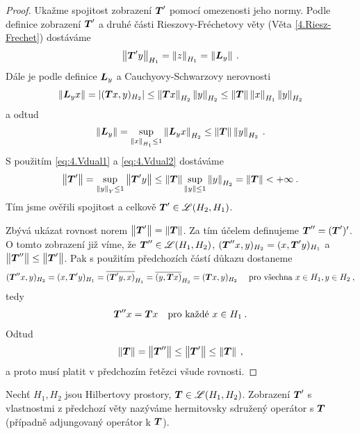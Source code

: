 \begin{proof}
Ukažme spojitost zobrazení $\boldsymbol{T}'$ pomocí omezenosti jeho normy. Podle definice zobrazení $\boldsymbol{T}'$ a druhé části Rieszovy-Fréchetovy věty (Věta \ref{4.Riesz-Frechet}) dostáváme \begin{align} \label{eq:4.Vdual1}
    \left\lVert\boldsymbol{T}' y\right\rVert_{H_1} = \left\lVert z\right\rVert_{H_1} = \left\lVert\boldsymbol{L}_y\right\rVert \:.
\end{align}
Dále je podle definice $\boldsymbol{L}_y$ a Cauchyovy-Schwarzovy nerovnosti \begin{align*}
    \left\lVert\boldsymbol{L}_y x\right\rVert = |(\boldsymbol{T}x, y)_{H_2}| \leq \left\lVert\boldsymbol{T}x\right\rVert_{H_2} \left\lVert y\right\rVert_{H_2} \leq \left\lVert\boldsymbol{T}\right\rVert \left\lVert x\right\rVert_{H_1} \left\lVert y\right\rVert_{H_2}
\end{align*}
a odtud \begin{align} \label{eq:4.Vdual2}
    \left\lVert\boldsymbol{L}_y\right\rVert = \sup_{\left\lVert x\right\rVert_{H_1} \leq 1} \left\lVert\boldsymbol{L}_y x\right\rVert_{H_2} \leq \left\lVert\boldsymbol{T}\right\rVert \left\lVert y\right\rVert_{H_2} \:.
\end{align}
S použitím \eqref{eq:4.Vdual1} a \eqref{eq:4.Vdual2} dostáváme \begin{align*}
    \left\lVert\boldsymbol{T}'\right\rVert = \sup_{\left\lVert y\right\rVert_Y \leq 1} \left\lVert\boldsymbol{T}' y\right\rVert \leq  \left\lVert\boldsymbol{T}\right\rVert \sup_{\left\lVert y\right\rVert \leq 1} \left\lVert y\right\rVert_{H_2} = \left\lVert\boldsymbol{T}\right\rVert < + \infty \:.
\end{align*}
Tím jsme ověřili spojitost a celkově $\boldsymbol{T}' \in \mathscr{L}(H_2, H_1)$.

Zbývá ukázat rovnost norem $\left\lVert\boldsymbol{T}'\right\rVert = \left\lVert\boldsymbol{T}\right\rVert$. Za tím účelem definujeme $\boldsymbol{T}'' = (\boldsymbol{T}')'$. O tomto zobrazení již víme, že $\boldsymbol{T}'' \in \mathscr{L}(H_1, H_2)$, $(\boldsymbol{T}'' x,y)_{H_2} = (x, \boldsymbol{T}' y)_{H_1}$ a $\left\lVert\boldsymbol{T}''\right\rVert \leq \left\lVert\boldsymbol{T}'\right\rVert$. Pak s použitím předchozích částí důkazu dostaneme \begin{align*}
    (\boldsymbol{T}'' x,y)_{H_2} = (x, \boldsymbol{T}'y)_{H_1} = \overline{(\boldsymbol{T}' y, x)}_{H_1} = \overline{(y, \boldsymbol{T} x)}_{H_2} = (\boldsymbol{T} x,y)_{H_2} \quad \text{ pro všechna } x \in H_1, y \in H_2 \:,
\end{align*}
tedy \begin{align*}
    \boldsymbol{T}'' x= \boldsymbol{T} x \quad \text{pro každé } x \in H_1 \:.
\end{align*}
Odtud \begin{align*}
    \left\lVert\boldsymbol{T}\right\rVert = \left\lVert\boldsymbol{T}''\right\rVert \leq \left\lVert\boldsymbol{T}'\right\rVert \leq \left\lVert\boldsymbol{T}\right\rVert \:,
\end{align*}
a proto musí platit v předchozím řetězci všude rovnosti.
\end{proof}
\begin{definition}
Nechť $H_1, H_2$ jsou Hilbertovy prostory, $\boldsymbol{T} \in \mathscr{L} (H_1, H_2) $. Zobrazení $\boldsymbol{T}'$ s vlastnostmi z předchozí věty nazýváme hermitovsky sdružený operátor s $\boldsymbol{T}$ (případně adjungovaný operátor k $\boldsymbol{T}$).
\end{definition}

